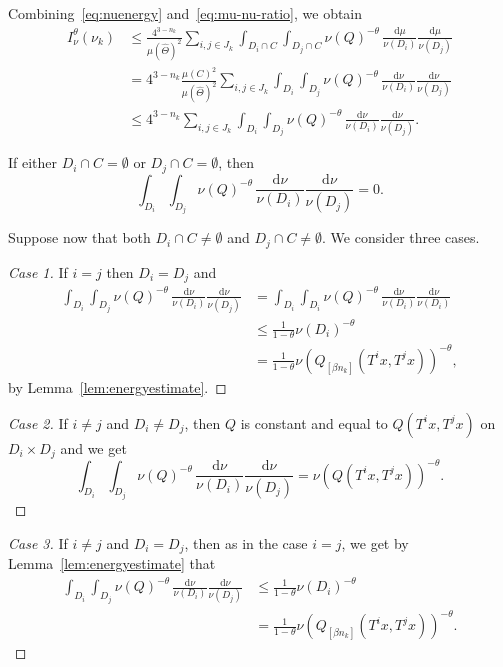 \documentclass[11pt]{article}
\theoremstyle{definition}
\numberwithin{equation}{section}
\numberwithin{figure}{section}
\numberwithin{table}{section}
\newcommand*{\dd}{\mathrm{d}}
\newenvironment{step}{\begin{proof}}{\let\qed\relax \end{proof}}
\begin{document}
Combining~\eqref{eq:nuenergy} and~\eqref{eq:mu-nu-ratio}, we obtain
\begin{align*}
I_\nu^\theta (\nu_k) &\leq \frac{4^{3-n_k}}{\mu (\hat{\Theta})^2}
\sum_{i,j \in J_k} \int_{D_i \cap C} \int_{D_j \cap C} \nu (Q)^{-\theta} \, \frac{\dd \mu}{\nu (D_i)} \frac{\dd
\mu}{\nu (D_j)} \\ &= 4^{3-n_k} \frac{\mu(C)^2}{\mu (\hat{\Theta})^2} \sum_{i,j \in J_k} \int_{D_i} \int_{D_j} \nu (Q)^{-\theta} \, \frac{\dd \nu}{\nu (D_i)} \frac{\dd
\nu}{\nu (D_j)} \\ &\leq 4^{3-n_k} \sum_{i,j \in J_k} \int_{D_i}
\int_{D_j} \nu (Q)^{-\theta} \, \frac{\dd \nu}{\nu (D_i)}
\frac{\dd \nu}{\nu (D_j)}.
\end{align*}

If either $D_i \cap C = \emptyset$ or $D_j \cap C = \emptyset$, then
\[
\int_{D_i} \int_{D_j} \nu (Q)^{-\theta} \, \frac{\dd \nu}{\nu (D_i)} \frac{\dd \nu}{\nu (D_j)} = 0.
\]

Suppose now that both $D_i \cap C \neq \emptyset$ and $D_j \cap C \neq
\emptyset$. We consider three cases.

\begin{step}[Case 1]
If $i = j$ then $D_i = D_j$ and
\begin{align*}
\int_{D_i} \int_{D_j} \nu (Q)^{-\theta} \, \frac{\dd \nu}{\nu (D_i)} \frac{\dd \nu}{\nu (D_j)} &= \int_{D_i} \int_{D_i}
\nu (Q)^{-\theta} \, \frac{\dd \nu}{\nu (D_i)}
\frac{\dd \nu}{\nu (D_i)} \\ &\leq \frac{1}{1 - \theta} \nu (D_i)^{-\theta} \\ &= \frac{1}{1-\theta} \nu (Q_{[\beta n_k]} (T^i x, T^j x))^{-\theta},
\end{align*}
by Lemma~\ref{lem:energyestimate}.
\end{step}

\begin{step}[Case 2]
If $i \neq j$ and $D_i \neq D_j$, then $Q$ is constant and equal to $Q(T^i x, T^j x)$ on $D_i \times D_j$ and we get
\[
\int_{D_i} \int_{D_j} \nu (Q)^{-\theta} \, \frac{\dd \nu}{\nu (D_i)} \frac{\dd \nu}{\nu (D_j)} = \nu (Q (T^i x, T^j x))^{-\theta}.
\]
\end{step}

\begin{step}[Case 3]
If $i \neq j$ and $D_i = D_j$, then as in the case $i = j$, we get by Lemma~\ref{lem:energyestimate} that
\begin{align*}
\int_{D_i} \int_{D_j} \nu (Q)^{-\theta} \, \frac{\dd \nu}{\nu (D_i)} \frac{\dd \nu}{\nu (D_j)} & \leq \frac{1}{1-\theta}
\nu (D_i)^{-\theta} \\ &= \frac{1}{1-\theta} \nu (Q_{[\beta n_k]} (T^i x, T^j x))^{-\theta}.
\end{align*}
\end{step}
\end{document}
